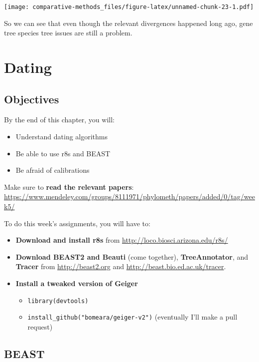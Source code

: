 \documentclass[]{article}
\providecommand{\tightlist}{%
  \setlength{\itemsep}{0pt}\setlength{\parskip}{0pt}}
\theoremstyle{definition}
\theoremstyle{definition}
\theoremstyle{definition}
\theoremstyle{remark}
\begin{document}
\texttt{[image: comparative-methods\_files/figure-latex/unnamed-chunk-23-1.pdf]}

So we can see that even though the relevant divergences happened long
ago, gene tree species tree issues are still a problem.

\hypertarget{dating}{%
\section{Dating}\label{dating}}

\hypertarget{objectives-8}{%
\subsection{Objectives}\label{objectives-8}}

By the end of this chapter, you will:

\begin{itemize}
\tightlist
\item
  Understand dating algorithms
\item
  Be able to use r8s and BEAST
\item
  Be afraid of calibrations
\end{itemize}

Make sure to \textbf{read the relevant papers}:
\url{https://www.mendeley.com/groups/8111971/phylometh/papers/added/0/tag/week5/}

To do this week's assignments, you will have to:

\begin{itemize}
\tightlist
\item
  \textbf{Download and install r8s} from
  \url{http://loco.biosci.arizona.edu/r8s/}
\item
  \textbf{Download BEAST2 and Beauti} (come together),
  \textbf{TreeAnnotator}, and \textbf{Tracer} from
  \url{http://beast2.org} and \url{http://beast.bio.ed.ac.uk/tracer}.
\item
  \textbf{Install a tweaked version of Geiger}

  \begin{itemize}
  \tightlist
  \item
    \texttt{library(devtools)}
  \item
    \texttt{install\_github("bomeara/geiger-v2")} (eventually I'll make
    a pull request)
  \end{itemize}
\end{itemize}

\hypertarget{beast}{%
\subsection{BEAST}\label{beast}}
\end{document}
